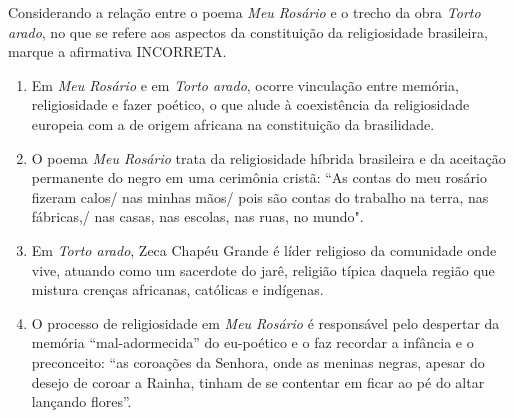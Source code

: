 \par

Considerando a relação entre o poema \textit{Meu Rosário} e o trecho da obra \textit{Torto arado}, no que se refere aos aspectos da constituição da religiosidade brasileira, marque a afirmativa INCORRETA.\begin{enumerate}
\item Em \textit{Meu Rosário} e em \textit{Torto arado}, ocorre vinculação entre memória, religiosidade e fazer poético, o que
       alude à coexistência da religiosidade europeia com a de origem africana na constituição da brasilidade.
\item O poema \textit{Meu Rosário} trata da religiosidade híbrida brasileira e da aceitação permanente do negro em
       uma cerimônia cristã: “As contas do meu rosário fizeram calos/ nas minhas mãos/ pois são contas do
       trabalho na terra, nas fábricas,/ nas casas, nas escolas, nas ruas, no mundo".
\item Em \textit{Torto arado}, Zeca Chapéu Grande é líder religioso da comunidade onde vive, atuando como um
       sacerdote do jarê, religião típica daquela região que mistura crenças africanas, católicas e indígenas.
\item O processo de religiosidade em \textit{Meu Rosário} é responsável pelo despertar da memória “mal-adormecida” do
       eu-poético e o faz recordar a infância e o preconceito: “as coroações da Senhora, onde as meninas negras,
       apesar do desejo de coroar a Rainha, tinham de se contentar em ficar ao pé do altar lançando flores”.\end{enumerate}
